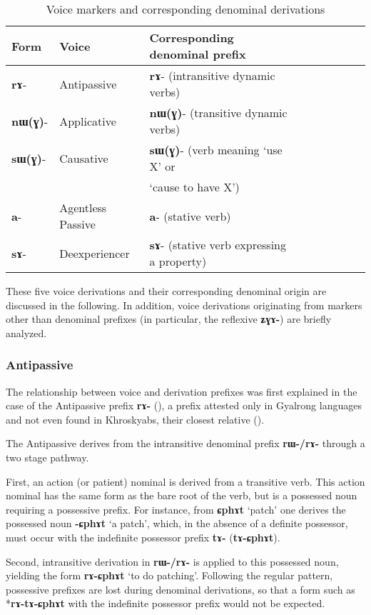 \documentclass[oldfontcommands,oneside,a4paper,11pt]{article}
\newcommand{\ipa}[1]{\mbox{\phon\textbf{#1}}} %
\begin{document}
\begin{table}[H] \caption{Voice markers and corresponding denominal derivations} \label{tab:denom} \centering
\begin{tabular}{lllllllll} \toprule
Form& Voice & Corresponding denominal prefix \\
\midrule
\ipa{rɤ}- & Antipassive &    \ipa{rɤ}- (intransitive dynamic verbs)\\
\ipa{nɯ(ɣ)}- & Applicative &    \ipa{nɯ(ɣ)}- (transitive dynamic verbs)\\
\ipa{sɯ(ɣ)}- & Causative &    \ipa{sɯ(ɣ)}- (verb meaning `use X' or \\
&& `cause to have X') \\
\ipa{a}- & Agentless Passive &    \ipa{a}- (stative verb)\\
\ipa{sɤ}-  & Deexperiencer &    \ipa{sɤ}- (stative verb expressing a property)\\
    \bottomrule
\end{tabular}
\end{table}

These five voice derivations and their corresponding denominal origin are discussed in the following. In addition, voice derivations originating from markers other than denominal prefixes (in particular, the reflexive \ipa{ʑɣɤ-}) are briefly analyzed.

\subsubsection{Antipassive} \label{sec:apass}
The relationship between voice and derivation prefixes was first explained in the case of the Antipassive prefix \ipa{rɤ-} (\citealt{jacques14antipassive}), a prefix attested only in Gyalrong languages and not even found in Khroskyabs, their closest relative (\citealt{lai13affixale}).


The Antipassive derives from the intransitive denominal prefix \ipa{rɯ-/rɤ-} through a two stage pathway.

First, an action (or patient) nominal is derived from a transitive verb. This action nominal has the same form as the bare root of the verb, but is a possessed noun requiring a possessive prefix. For instance, from \ipa{ɕphɤt} `patch' one derives the possessed noun 
\ipa{-ɕphɤt} `a patch', which, in the absence of a definite possessor, must occur with the indefinite possessor prefix \ipa{tɤ-} (\ipa{tɤ-ɕphɤt}).

Second, intransitive derivation in \ipa{rɯ-/rɤ-} is applied to this possessed noun, yielding the form \ipa{rɤ-ɕphɤt} `to do patching'. Following the regular pattern, possessive prefixes are lost during denominal derivations, so that a form such as *\ipa{rɤ-tɤ-ɕphɤt} with the indefinite possessor prefix would not be expected.
\end{document}
